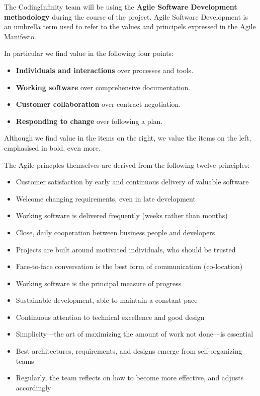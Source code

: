 The CodingInfinity team will be using the \textbf{Agile Software Development methodology} during the course of the project. Agile Software Development is an umbrella term used to refer to the values and principels expressed in the Agile Manifesto.


In particular we find value in the following four points:
\begin{itemize}
	\item \textbf{Individuals and interactions} over processes and tools.
	\item \textbf{Working software} over comprehensive documentation.
	\item \textbf{Customer collaboration} over contract negotiation.
	\item \textbf{Responding to change} over following a plan.
\end{itemize}

Although we find value in the items on the right, we value the items on the left, emphasised in bold, even more.

The Agile princples themselves are derived from the following twelve principles:
\begin{itemize}
  \item Customer satisfaction by early and continuous delivery of valuable software
  \item Welcome changing requirements, even in late development
  \item Working software is delivered frequently (weeks rather than months)
  \item Close, daily cooperation between business people and developers
  \item Projects are built around motivated individuals, who should be trusted
  \item Face-to-face conversation is the best form of communication (co-location)
  \item Working software is the principal measure of progress
  \item Sustainable development, able to maintain a constant pace
  \item Continuous attention to technical excellence and good design
  \item Simplicity—the art of maximizing the amount of work not done—is essential
  \item Best architectures, requirements, and designs emerge from self-organizing teams
  \item Regularly, the team reflects on how to become more effective, and adjusts accordingly
\end{itemize}

